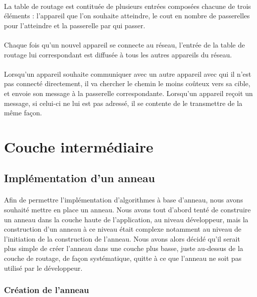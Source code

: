 \documentclass[a4paper,10pt]{report}
\begin{document}
    \paragraph{}
    La table de routage est contituée de plusieurs entrées composées chacune de trois éléments : l'appareil que l'on souhaite atteindre, le cout en nombre de passerelles pour l'atteindre et la passerelle par qui passer.
    \paragraph{}
    Chaque fois qu'un nouvel appareil se connecte au réseau, l'entrée de la table de routage lui correspondant est diffusée à tous les autres appareils du réseau.
    \paragraph{}
    Lorsqu'un appareil souhaite communiquer avec un autre appareil avec qui il n'est pas connecté directement, il va chercher le chemin le moins coûteux vers sa cible, et envoie son message à la passerelle correspondante. Lorsqu'un appareil reçoit un message, si celui-ci ne lui est pas adressé, il se contente de le transmettre de la même façon.
  
  \section{Couche intermédiaire}
    \subsection{Implémentation d'un anneau}
    \paragraph{}
    Afin de permettre l'implémentation d'algorithmes à base d'anneau, nous avons souhaité mettre en place un anneau. Nous avons tout d'abord tenté de construire un anneau dans la couche haute de l'application, au niveau développeur, mais la construction d'un anneau à ce niveau était complexe notamment au niveau de l'initiation de la construction de l'anneau. Nous avons alors décidé qu'il serait plus simple de créer l'anneau dans une couche plus basse, juste au-dessus de la couche de routage, de façon systématique, quitte à ce que l'anneau ne soit pas utilisé par le développeur.
    
      \subsubsection{Création de l'anneau}
\end{document}
